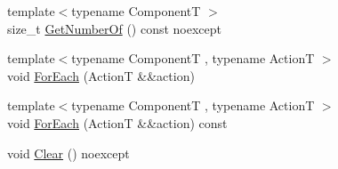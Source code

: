 \begin{DoxyCompactItemize}
\item 
{\footnotesize template$<$typename ComponentT $>$ }\\size\+\_\+t \mbox{\hyperlink{classmage_1_1rendering_1_1_world_a3f5ff2ff451a90af7071bddf9d226618}{Get\+Number\+Of}} () const noexcept
\item 
{\footnotesize template$<$typename ComponentT , typename ActionT $>$ }\\void \mbox{\hyperlink{classmage_1_1rendering_1_1_world_a8ec9ac4bef64ec20111cd7cfddd4e379}{For\+Each}} (ActionT \&\&action)
\item 
{\footnotesize template$<$typename ComponentT , typename ActionT $>$ }\\void \mbox{\hyperlink{classmage_1_1rendering_1_1_world_a0461e3f09a19e4f6a64f77d04ac1b672}{For\+Each}} (ActionT \&\&action) const
\item 
void \mbox{\hyperlink{classmage_1_1rendering_1_1_world_ac04420d32e7cb0a28c33d7d451ca05cc}{Clear}} () noexcept
\end{DoxyCompactItemize}
